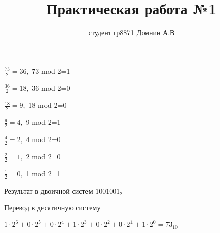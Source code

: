 \documentclass[a4paper,11pt]{article}
\title{Практическая работа №1}
\author{студент гр8871 Домнин А.В }
\begin{document}
\maketitle
$
\frac {73}{2}=36,
$
 {73} mod {2}=1 

$
\frac {36}{2}=18,
$
 {36} mod {2}=0 

$
\frac {18}{2}=9,
$
 {18} mod {2}=0 

$
\frac {9}{2}=4,
$
 {9} mod {2}=1 

$
\frac {4}{2}=2,
$
 {4} mod {2}=0 

$
\frac {2}{2}=1,
$
{2} mod {2}=0 

$
\frac {1}{2}=0,
$
 {1} mod {2}=1 


Результат в двоичной систем  
$1001001_{2}$

Перевод в десятичную систему

$1\cdot2^6+0\cdot2^5+0\cdot2^4+1\cdot2^3+0\cdot2^2+0\cdot2^1+1\cdot2^0=73_{10}$
\end{document}

